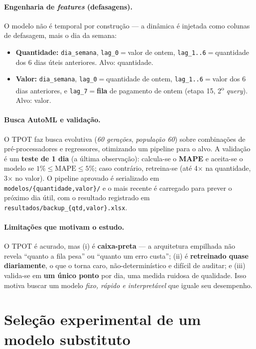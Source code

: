 \documentclass[11pt,a4paper]{article}
\begin{document}
\paragraph{Engenharia de \emph{features} (defasagens).} O modelo não é temporal por construção ---
a dinâmica é injetada como colunas de defasagem, mais o dia da semana:
\begin{itemize}\setlength\itemsep{1pt}
\item \textbf{Quantidade:} \texttt{dia\_semana}, \texttt{lag\_0}$=$valor de ontem,
\texttt{lag\_1..6}$=$quantidade dos 6 dias úteis anteriores. Alvo: quantidade.
\item \textbf{Valor:} \texttt{dia\_semana}, \texttt{lag\_0}$=$quantidade de ontem,
\texttt{lag\_1..6}$=$valor dos 6 dias anteriores, e \texttt{lag\_7}$=$\textbf{fila} de pagamento de
ontem (etapa 15, 2\textsuperscript{o} \emph{query}). Alvo: valor.
\end{itemize}

\paragraph{Busca AutoML e validação.} O TPOT faz busca evolutiva (\emph{60 gerações},
\emph{população 60}) sobre combinações de pré-processadores e regressores, otimizando um pipeline
para o alvo. A validação é um \textbf{teste de 1 dia} (a última observação): calcula-se o
\textbf{MAPE} e aceita-se o modelo se $1\% \le \text{MAPE} \le 5\%$; caso contrário, retreina-se
(até 4$\times$ na quantidade, 3$\times$ no valor). O pipeline aprovado é serializado em
\texttt{modelos/\{quantidade,valor\}/} e o mais recente é carregado para prever o próximo dia útil,
com o resultado registrado em \texttt{resultados/backup\_\{qtd,valor\}.xlsx}.

\paragraph{Limitações que motivam o estudo.} O TPOT é acurado, mas (i) é \textbf{caixa-preta} ---
a arquitetura empilhada não revela ``quanto a fila pesa'' ou ``quanto um erro custa''; (ii) é
\textbf{retreinado quase diariamente}, o que o torna caro, não-determinístico e difícil de
auditar; e (iii) valida-se em \textbf{um único ponto} por dia, uma medida ruidosa de qualidade.
Isso motiva buscar um modelo \emph{fixo, rápido e interpretável} que iguale seu desempenho.

\section{Seleção experimental de um modelo substituto}
\label{sec:experimento}
\end{document}

